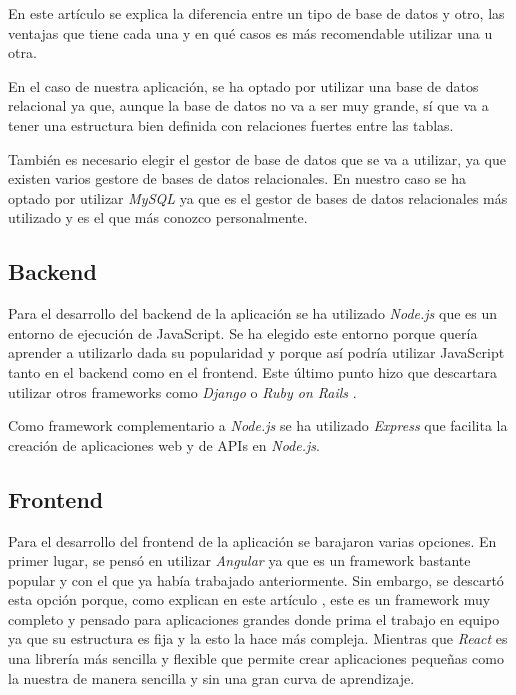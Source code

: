 En este artículo \cite{relational-vs-non-relational} se explica la diferencia entre
un tipo de base de datos y otro, las ventajas que tiene cada una y en qué casos es
más recomendable utilizar una u otra.

En el caso de nuestra aplicación, se ha optado por utilizar una base de datos relacional
ya que, aunque la base de datos no va a ser muy grande, sí que va a tener una estructura
bien definida con relaciones fuertes entre las tablas.

También es necesario elegir el gestor de base de datos que se va a utilizar, ya que
existen varios gestore de bases de datos relacionales. En nuestro caso se ha optado
por utilizar \textit{MySQL} \cite{mysql} ya que es el gestor de bases de datos
relacionales más utilizado y es el que más conozco personalmente.

\subsection{Backend}
Para el desarrollo del backend de la aplicación se ha utilizado \textit{Node.js}
\cite{nodejs} que es un entorno de ejecución de JavaScript. Se ha elegido este
entorno porque quería aprender a utilizarlo dada su popularidad y porque así podría
utilizar JavaScript tanto en el backend como en el frontend. Este último punto
hizo que descartara utilizar otros frameworks como \textit{Django} \cite{django}
o \textit{Ruby on Rails} \cite{ruby-on-rails}.

Como framework complementario a \textit{Node.js} se ha utilizado \textit{Express}
\cite{express} que facilita la creación de aplicaciones web y de APIs en \textit{Node.js}.

\subsection{Frontend}
Para el desarrollo del frontend de la aplicación se barajaron varias opciones.
En primer lugar, se pensó en utilizar \textit{Angular} \cite{angular} ya que es un
framework bastante popular y con el que ya había trabajado anteriormente. Sin embargo,
se descartó esta opción porque, como explican en este artículo \cite{angular-vs-react},
este es un framework muy completo y pensado para aplicaciones grandes donde prima el
trabajo en equipo ya que su estructura es fija y la esto la hace más compleja. Mientras
que \textit{React} \cite{react} es una librería más sencilla y flexible que permite
crear aplicaciones pequeñas como la nuestra de manera sencilla y sin una gran curva de
aprendizaje.


